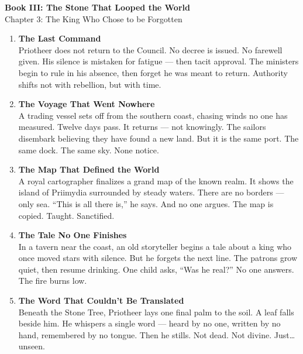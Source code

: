 \documentclass[9pt]{article}
\begin{document}
\begin{center}
    \Large\textbf{Book III: The Stone That Looped the World} \\
    \large Chapter 3: The King Who Chose to be Forgotten\\
\end{center}

\vspace{1in}


\begin{enumerate}
    \item \textbf{The Last Command} \\
    Priotheer does not return to the Council. No decree is issued. No farewell given. His silence is mistaken for fatigue — then tacit approval. The ministers begin to rule in his absence, then forget he was meant to return. Authority shifts not with rebellion, but with time.

    \vspace{1em}
    \item \textbf{The Voyage That Went Nowhere} \\
    A trading vessel sets off from the southern coast, chasing winds no one has measured. Twelve days pass. It returns — not knowingly. The sailors disembark believing they have found a new land. But it is the same port. The same dock. The same sky. None notice.

    \vspace{1em}
    \item \textbf{The Map That Defined the World} \\
    A royal cartographer finalizes a grand map of the known realm. It shows the island of Priimydia surrounded by steady waters. There are no borders — only sea. “This is all there is,” he says. And no one argues. The map is copied. Taught. Sanctified.

    \vspace{1em}
    \item \textbf{The Tale No One Finishes} \\
    In a tavern near the coast, an old storyteller begins a tale about a king who once moved stars with silence. But he forgets the next line. The patrons grow quiet, then resume drinking. One child asks, “Was he real?” No one answers. The fire burns low.

    \vspace{1em}
    \item \textbf{The Word That Couldn’t Be Translated} \\
    Beneath the Stone Tree, Priotheer lays one final palm to the soil. A leaf falls beside him. He whispers a single word — heard by no one, written by no hand, remembered by no tongue. Then he stills. Not dead. Not divine. Just… unseen.


\end{enumerate}
\end{document}
